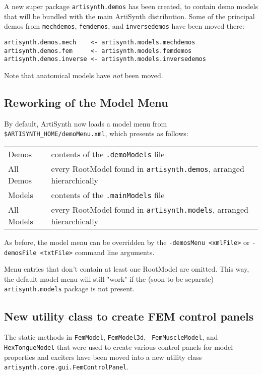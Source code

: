\documentclass{article}
\begin{document}
A new super package {\tt artisynth.demos} has been created, to contain
demo models that will be bundled with the main ArtiSynth distribution.
Some of the principal demos from {\tt mechdemos}, {\tt femdemos}, 
and {\tt inversedemos} have been moved there:

\begin{lstlisting}
artisynth.demos.mech    <- artisynth.models.mechdemos
artisynth.demos.fem     <- artisynth.models.femdemos
artisynth.demos.inverse <- artisynth.models.inversedemos
\end{lstlisting}

Note that anatomical models have {\it not} been moved.

\subsection*{Reworking of the Model Menu}

By default, ArtiSynth now loads a model menu from {\tt
\$ARTISYNTH\_HOME/demoMenu.xml}, which presents as follows:

\begin{tabular}{ll}
{\sf Demos} & contents of the {\tt .demoModels} file\\
{\sf All Demos} & every RootModel found in {\tt artisynth.demos}, arranged
hierarchically\\
{\sf Models} & contents of the {\tt .mainModels} file\\
{\sf All Models} & every RootModel found in {\tt artisynth.models}, arranged
hierarchically
\end{tabular}

As before, the model menu can be overridden by the 
{\tt -demosMenu <xmlFile>} or
{\tt -demosFile <txtFile>} command line arguments.

Menu entries that don't contain at least one RootModel are omitted.
This way, the default model menu will still "work" if the (soon to be
separate) {\tt artisynth.models} package is not present.

\subsection*{New utility class to create FEM control panels}

The static methods in {\tt FemModel}, {\tt FemModel3d}, {\tt
FemMuscleModel}, and {\tt HexTongueModel} that were used to create
various control panels for model properties and exciters have been
moved into a new utility class 
{\tt artisynth.core.gui.FemControlPanel}.
\end{document}
